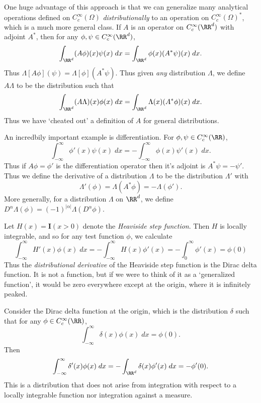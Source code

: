 One huge advantage of this approach is that we can generalize many analytical operations defined on $C_c^\infty(\Omega)$ \emph{distributionally} to an operation on $C_c^\infty(\Omega)^*$, which is a much more general class. If $A$ is an operator on $C_c^\infty(\RR^d)$ with adjoint $A^*$, then for any $\phi,\psi \in C_c^\infty(\RR^d)$,
%
\[ \int_{\RR^d} (A\phi)(x) \psi(x)\; dx = \int_{\RR^d} \phi(x) (A^* \psi)(x)\; dx. \]
%
Thus $\Lambda[A\phi](\psi) = \Lambda[\phi](A^* \psi)$. Thus given \emph{any} distribution $\Lambda$, we define $A \Lambda$ to be the distribution such that
%
\[ \int_{\RR^d} (A \Lambda)(x) \phi(x)\; dx = \int_{\RR^d} \Lambda(x) (A^* \phi)(x)\; dx. \]
%
Thus we have `cheated out' a definition of $A$ for general distributions.

An incredbily important example is differentiation. For $\phi,\psi \in C_c^\infty(\RR)$,
%
\[ \int_{-\infty}^\infty \phi'(x) \psi(x)\; dx = - \int_{-\infty}^\infty \phi(x) \psi'(x)\; dx. \]
%
Thus if $A\phi = \phi'$ is the differentiation operator then it's adjoint is $A^* \psi = - \psi'$. Thus we define the derivative of a distribution $\Lambda$ to be the distribution $\Lambda'$ with
%
\[ \Lambda'(\phi) = \Lambda(A^* \phi) = - \Lambda(\phi'). \]
%
More generally, for a distribution $\Lambda$ on $\RR^d$, we define $D^\alpha \Lambda(\phi) = (-1)^{|\alpha|} \Lambda(D^\alpha \phi)$.

\begin{example}
    Let $H(x) = \mathbf{I}(x > 0)$ denote the {\it Heaviside step function}. Then $H$ is locally integrable, and so for any test function $\phi$, we calculate
    \[ \int_{-\infty}^\infty H'(x) \phi(x)\; dx = - \int_{-\infty}^\infty H(x) \phi'(x) = - \int_0^\infty \phi'(x) = \phi(0) \]
    Thus the \emph{distributional derivative} of the Heaviside step function is the Dirac delta function. It is not a function, but if we were to think of it as a `generalized function', it would be zero everywhere except at the origin, where it is infinitely peaked.
\end{example}

\begin{example}
    Consider the Dirac delta function at the origin, which is the distribution $\delta$ such that for any $\phi \in C_c^\infty(\RR)$,
    \[ \int_{-\infty}^\infty \delta(x) \phi(x)\; dx = \phi(0). \]
    Then
    \[ \int_{-\infty}^\infty \delta'(x) \phi(x)\; dx = - \int_{\RR^d} \delta(x) \phi'(x)\; dx = - \phi'(0). \]
    This is a distribution that does not arise from integration with respect to a locally integrable function nor integration against a measure.
\end{example}

